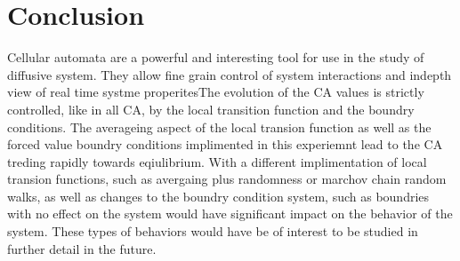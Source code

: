 \documentclass[11pt,twocolumn]{article}
\begin{document}
\section{Conclusion}
Cellular automata are a powerful and interesting tool for use in the study of diffusive system. They allow fine grain control of system interactions and indepth view of real time systme properites\cite{weimar}The evolution of the CA values is strictly controlled, like in all CA, by the local transition function and the boundry conditions\cite{wolfram94}. The averageing aspect of the local transion function as well as the forced value boundry conditions implimented in this experiemnt lead to the CA treding rapidly towards eqiulibrium. 
With a different implimentation of local transion functions, such as avergaing plus randomness\cite{yang01} or marchov chain random walks, as well as 
changes to the boundry condition system, such as boundries with no effect on the system would have significant impact on the behavior of the system. 
These types of behaviors would have be of interest to be studied in further detail in the future.
\end{document}
